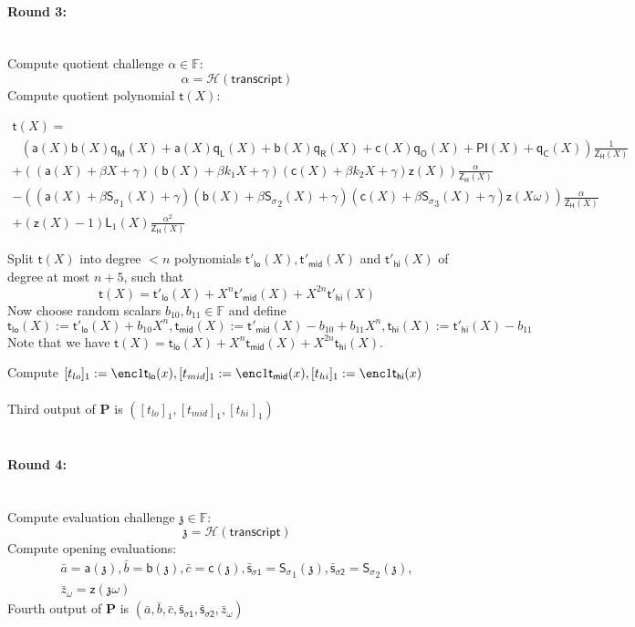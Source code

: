 \documentclass[11pt]{article} %
\newcommand{\F}{\ensuremath{\mathbb F}\xspace}
\newcommand{\chalpoint}{\ensuremath{\mathfrak{z}}\xspace}
\newcommand{\defeq}{:=}
\newcommand{\hash}{\ensuremath{\mathcal{H}}\xspace}
\newcommand{\prv}{\ensuremath{\mathsf{\mathbf{P}}}\xspace}
\newcommand{\sigpoly}{\ensuremath{\mathsf{S_{\sigma}}}\xspace}
\newcommand{\sigpolyevala}{\ensuremath{\mathsf{\bar{s}_{\sigma1}}}\xspace}
\newcommand{\sigpolyevalb}{\ensuremath{\mathsf{\bar{s}_{\sigma2}}}\xspace}
\newcommand{\pubinppoly}{\ensuremath{\mathsf{PI}}\xspace}
\newcommand{\ZeroH}{\ensuremath{Z_{H}} \xspace}
\newcommand{\lpoly}{\ensuremath{\mathsf{a}}\xspace}
\newcommand{\rpoly}{\ensuremath{\mathsf{b}}\xspace}
\newcommand{\opoly}{\ensuremath{\mathsf{c}}\xspace}
\newcommand{\idpermpoly}{\ensuremath{\mathsf{z}}\xspace}
\newcommand{\lagrangepoly}{\ensuremath{\mathsf{L}}\xspace}
\newcommand{\zeropoly}{\ensuremath{\mathsf{\ZeroH}}\xspace}
\newcommand{\snark}{\ensuremath{\mathsf{snark}}\xspace}
\newcommand{\Prove}{\mathcal{P}}
\newcommand{\Psnark}{\prv}%
\newcommand{\transcript}{\ensuremath{\mathsf{transcript}}\xspace}
\newcommand{\tlo}{\ensuremath{\mathsf{t_{lo}}}\xspace}
\newcommand{\tprimelo}{\ensuremath{\mathsf{t'_{lo}}}\xspace}
\newcommand{\tmid}{\ensuremath{\mathsf{t_{mid}}}\xspace}
\newcommand{\tprimemid}{\ensuremath{\mathsf{t'_{mid}}}\xspace}
\newcommand{\thi}{\ensuremath{\mathsf{t_{hi}}}\xspace}
\newcommand{\tprimehi}{\ensuremath{\mathsf{t'_{hi}}}\xspace}
\begin{document}
	\paragraph{\textbf{Round 3:}} \ \\
	Compute quotient challenge $\alpha \in \F:$ \[ \alpha = \hash(\transcript) \]
	Compute quotient polynomial $\mathsf{t}(X):$
	\begin{adjustwidth*}{-22mm}{-22mm}
	$$
	\begin{array}{l}
	\mathsf{t}(X) = \\
	\ \ \ \left( \lpoly(X)\rpoly(X)\mathsf{q_M}(X) + \lpoly(X)\mathsf{q_L}(X) + \rpoly(X)\mathsf{q_R}(X) + \opoly(X)\mathsf{q_O}(X) + \pubinppoly(X) + \mathsf{q_C}(X) \right) \frac{1}{\zeropoly(X)} \\
	+ \left((\lpoly(X) + \beta X + \gamma)(\rpoly(X) + \beta k_1 X + \gamma)(\opoly(X) + \beta k_2 X + \gamma )\idpermpoly(X) \right) \frac{\alpha}{\zeropoly(X)} \\
	- \left((\lpoly(X) + \beta \sigpoly_1(X) + \gamma)(\rpoly(X) + \beta \sigpoly_2(X) + \gamma)(\opoly(X) + \beta \sigpoly_3(X) + \gamma) \idpermpoly(X\omega) \right)\frac{\alpha}{\zeropoly(X)} \\
	+ \left(\idpermpoly(X) - 1 \right) \lagrangepoly_1(X) \frac{\alpha^2}{\zeropoly(X)}
	\end{array}
	$$
	\end{adjustwidth*}
	Split $\mathsf{t}(X)$ into degree $<n$ polynomials $\tprimelo(X), \tprimemid(X)$ and $\tprimehi(X)$ of degree at most $n+5$, such that
	$$
	\mathsf{t}(X) = \tprimelo(X) + X^n\tprimemid(X) + X^{2n}\tprimehi(X)
	$$ 
	Now choose random scalars $b_{10},b_{11}\in \F$ and define
	\[\tlo(X)\defeq \tprimelo(X)+b_{10}X^n,\tmid(X)\defeq \tprimemid(X)-b_{10}+b_{11}X^n,\thi(X)\defeq \tprimehi(X)-b_{11}\]
	Note that we have $
	\mathsf{t}(X) = \tlo(X) + X^n\tmid(X) + X^{2n}\thi(X)$.
	
	Compute $[t_{lo}]_{1} := \enc1{\tlo(x)}, [t_{mid}]_1 := \enc1{\tmid(x)}, [t_{hi}]_1 := \enc1{\thi(x)}$ \\ \\
	Third output of $\Psnark$ is $([t_{lo}]_1, [t_{mid}]_1, [t_{hi}]_1)$
	\\ \\
	\noindent
	\paragraph{\textbf{Round 4:}} \ \\Compute evaluation challenge $\chalpoint \in \F:$ \[ \chalpoint = \hash(\transcript)\]
	Compute opening evaluations:
	$$
	\begin{array}{c}
	\bar{a} = \lpoly(\chalpoint), \bar{b} = \rpoly(\chalpoint), \bar{c} = \opoly(\chalpoint), \sigpolyevala = \sigpoly_1(\chalpoint), \sigpolyevalb = \sigpoly_2(\chalpoint), \\
	 \bar{z}_\omega = \idpermpoly(\chalpoint \omega)
	\end{array}
	$$
	Fourth output of $\Psnark$ is $(\bar{a}, \bar{b}, \bar{c}, \sigpolyevala, \sigpolyevalb, \bar{z}_\omega )$ \\ \\
	\noindent
\end{document}
